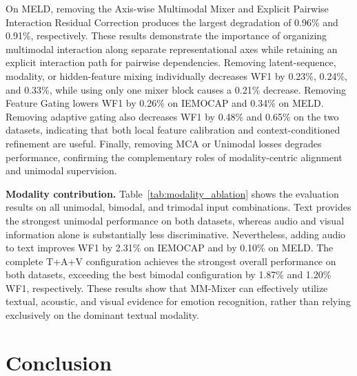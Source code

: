 \documentclass[letterpaper]{article} %
\begin{document}
On MELD, removing the Axis-wise Multimodal Mixer and Explicit Pairwise Interaction Residual Correction produces the largest degradation of 0.96\% and 0.91\%,
respectively. These results demonstrate the importance of organizing
multimodal interaction along separate representational axes while
retaining an explicit interaction path for pairwise dependencies. Removing
latent-sequence, modality, or hidden-feature mixing individually decreases WF1 by
0.23\%, 0.24\%, and 0.33\%, while using only one mixer block causes a
0.21\% decrease. Removing Feature Gating lowers WF1 by 0.26\%
on IEMOCAP and 0.34\% on MELD. Removing adaptive gating also decreases WF1
by 0.48\% and 0.65\% on the two datasets, indicating that both local
feature calibration and context-conditioned refinement are useful.
Finally, removing MCA or Unimodal losses degrades performance, confirming the complementary roles of modality-centric alignment and unimodal supervision.

\noindent\textbf{Modality contribution.}
Table~\ref{tab:modality_ablation} shows the evaluation results on all unimodal, bimodal, and trimodal input combinations. Text provides the strongest unimodal performance on both datasets, whereas audio and visual information alone is substantially less discriminative. Nevertheless, adding audio to text improves WF1 by 2.31\% on IEMOCAP and by 0.10\% on MELD. The complete T+A+V configuration achieves the strongest overall performance on both datasets, exceeding the best bimodal configuration by 1.87\% and 1.20\% WF1, respectively. These results show that MM-Mixer can effectively utilize textual, acoustic, and visual evidence for emotion recognition, rather than relying exclusively on the dominant textual modality.




\section{Conclusion}
\end{document}
